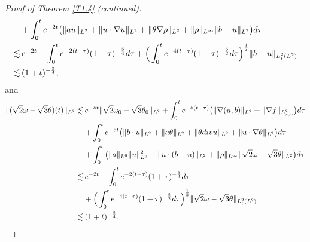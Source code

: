 \documentclass[10pt,a4paper]{amsart}
\begin{document}
\begin{proof}[Proof of Theorem \ref{T1.4} \emph{(}continued\emph{)}]
\begin{align}
&+\int_0^t e^{-2t}\big(\|au\|_{L^2}+\|u\cdot\nabla u\|_{L^2}
+\|\theta\nabla\rho\|_{L^2}+\|\rho\|_{L^\infty}\|b-u\|_{L^2}  \big){\rm d}\tau \nonumber\\
\lesssim&\, e^{-2t}+\int_0^t e^{-2(t-\tau)}(1+\tau)^{-\frac{5}{4}}{\rm d}\tau 
+\Big(\int_0^t e^{-4(t-\tau)}(1+\tau)^{-\frac{5}{2}}{\rm d}\tau\Big)^\frac{1}{2}\|b-u\|_{L_t^2(L^2)}\nonumber\\
\lesssim&\, (1+t)^{-\frac{5}{4}},
\end{align}
and
\begin{align}\label{NJKG3.163}
\|(\sqrt{2}\omega-\sqrt{3}\theta)(t)\|_{L^2}\lesssim&\, e^{-5t} \|\sqrt{2}\omega_0
-\sqrt{3}\theta_0\|_{L^2}+\int_0^t e^{-5(t-\tau)}\big(\|\nabla(u,b)\|_{L^2}
+\|\nabla f\|_{L_{x,v}^2}\big)  {\rm d}\tau\nonumber\\
&+\int_0^t e^{-5t}\big(\|b\cdot
 u\|_{L^2}+\|a\theta\|_{L^2}+\|\theta{\rm div} u\|_{L^2}+\|u\cdot\nabla\theta\|_{L^2} 
 \big){\rm d}\tau \nonumber\\
&+\int_0^t\big(  \|a\|_{L^6}\|u\|_{L^6}^2+\|u\cdot(b-u)\|_{L^2}  
+\|\rho\|_{L^\infty}\| \sqrt{2}\omega-\sqrt{3}\theta \|_{L^2} \big)
  {\rm d}\tau\nonumber\\
\lesssim&\, e^{-2t}+\int_0^t e^{-2(t-\tau)}(1+\tau)^{-\frac{5}{4}}{\rm d}\tau \nonumber\\
&+\Big(\int_0^t e^{-4(t-\tau)}(1+\tau)^{-\frac{5}{2}}{\rm d}\tau\Big)^\frac{1}{2}
\|\sqrt{2}\omega-\sqrt{3}\theta\|_{L_t^2(L^2)}\nonumber\\
\lesssim&\, (1+t)^{-\frac{5}{4}}.
\end{align}


\end{proof}
\end{document}
